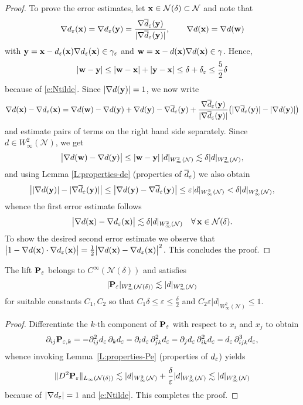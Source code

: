\begin{proof}
To prove the error estimates, let ${\bf x}\in{\mathcal{N}(\delta)}\subset\mathcal{N}$ and note that 
$$
\nabla d_\varepsilon({\bf x}) = \nabla d_\varepsilon ({\bf y}) = \frac{\nabla \overline{d}_\varepsilon({\bf y})}{|\nabla \overline{d}_\varepsilon({\bf y})|},
\qquad
\nabla d({\bf x}) = \nabla d({\bf w})
$$
with ${\bf y} = {\bf x}-d_\varepsilon({\bf x}) \nabla d_\varepsilon({\bf x})\in{\gamma_\varepsilon}$ and
${\bf w} = {\bf x}- d({\bf x})\nabla d({\bf x})\in\gamma$.
Hence, 
%
\[
|{\bf w}-{\bf y}| \le |{\bf w}-{\bf x}| + |{\bf y}-{\bf x}| \le \delta + {\delta_\varepsilon} \le \frac52\delta
\]
%
because of \eqref{e:Ntilde}. Since $|\nabla d({\bf y})|=1$, we now write
%
\[
\nabla d({\bf x}) - \nabla d_\varepsilon({\bf x}) =
\nabla d({\bf w}) - \nabla d({\bf y})
+ \nabla d({\bf y}) - \nabla \overline{d}_\varepsilon({\bf y})
+ \frac{\nabla \overline{d}_\varepsilon({\bf y})}{|\nabla \overline{d}_\varepsilon({\bf y})|}
  \big(|\nabla \overline{d}_\varepsilon({\bf y})| - |\nabla d({\bf y})|\big)
\]
%
and estimate pairs of terms on the right hand side separately. Since
$d\in W^2_\infty(\mathcal{N})$, we get
%
\[
\big| \nabla d({\bf w}) - \nabla d({\bf y})  \big| \le |{\bf w}-{\bf y}| \, |d|_{W^2_\infty(\mathcal{N})}
\lesssim \delta |d|_{W^2_\infty(\mathcal{N})},
\]
%
and using Lemma \ref{L:properties-de} (properties of $\overline{d}_\varepsilon$) we also obtain
%
\[
\big| |\nabla d({\bf y})| - |\nabla \overline{d}_\varepsilon({\bf y})| \big| \le
\big| \nabla d({\bf y}) - \nabla \overline{d}_\varepsilon({\bf y}) \big| \le \varepsilon |d|_{W^2_\infty(\mathcal{N})}
< \delta |d|_{W^2_\infty(\mathcal{N})},
\]
%
whence the first error estimate follows
%
\[
\big| \nabla d({\bf x}) - \nabla d_\varepsilon({\bf x})  \big| \lesssim
\delta |d|_{W^2_\infty(\mathcal{N})}
\quad\forall \, {\bf x} \in {\mathcal{N}(\delta)}.
\]
%
To show the desired second error estimate we observe that
$\big| 1 - \nabla d({\bf x})\cdot\nabla d_\varepsilon({\bf x}) \big|
= \frac12 \big| \nabla d({\bf x}) - \nabla d_\varepsilon({\bf x}) \big|^2$. This concludes the proof.
\end{proof}

\begin{corollary}\label{c:properties-Pe}
The lift ${{\bf P}_\varepsilon}$ belongs to $C^\infty(\mathcal N(\delta))$ and satisfies
%
$$
|{{\bf P}_\varepsilon}|_{W^2_\infty({\mathcal N(\delta)})} \lesssim |d|_{W^2_\infty(\mathcal N)}
$$
%
for suitable constants $C_1,C_2$ so that $C_1\delta \le \varepsilon \le \frac \delta 2$
and $C_2\varepsilon|d|_{W^2_\infty(\mathcal N)}\le 1$.
  \end{corollary}
  \begin{proof}
Differentiate the $k$-th component of ${{\bf P}_\varepsilon}$ with respect to $x_i$ and $x_j$
to obtain
%
\[
\partial_{ij} {\bf P}_{\varepsilon,k} = - \partial_{ij}^2 d_\varepsilon \, \partial_k d_\varepsilon
- \partial_i d_\varepsilon \, \partial_{jk}^2 d_\varepsilon - \partial_j d_\varepsilon \, \partial_{ik}^2 d_\varepsilon -  d_\varepsilon \, \partial_{ijk}^3 d_\varepsilon,
\]
%
whence invoking Lemma~\ref{L:properties-Pe} (properties of $d_\varepsilon$) yields
%
\[
\|D^2 {{\bf P}_\varepsilon}\|_{L_\infty({\mathcal{N}(\delta)})} \lesssim
|d|_{W^2_\infty(\mathcal N)} + \frac{\delta}{\varepsilon} |d|_{W^2_\infty(\mathcal N)}\lesssim
|d|_{W^2_\infty(\mathcal N)}
\]
%
because of $|\nabla d_\varepsilon|=1$ and \eqref{e:Ntilde}.
This completes the proof.
  \end{proof}
  
